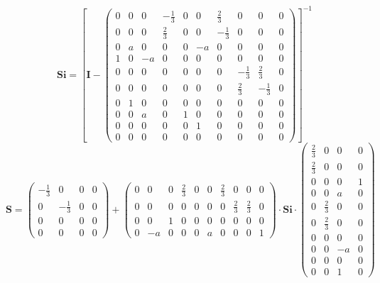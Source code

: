 \[ \mathbf{Si} =  \left[ \mathbf{I}  - \left(\begin{smallmatrix} 0 & 0 & 0 & -\frac{1}{3} & 0 & 0 & \frac{2}{3} & 0 & 0 & 0 \\ 0 & 0 & 0 & \frac{2}{3} & 0 & 0 & -\frac{1}{3} & 0 & 0 & 0 \\ 0 & a & 0 & 0 & 0 & -a & 0 & 0 & 0 & 0 \\ 1 & 0 & -a & 0 & 0 & 0 & 0 & 0 & 0 & 0 \\ 0 & 0 & 0 & 0 & 0 & 0 & 0 & -\frac{1}{3} & \frac{2}{3} & 0 \\ 0 & 0 & 0 & 0 & 0 & 0 & 0 & \frac{2}{3} & -\frac{1}{3} & 0 \\ 0 & 1 & 0 & 0 & 0 & 0 & 0 & 0 & 0 & 0 \\ 0 & 0 & a & 0 & 1 & 0 & 0 & 0 & 0 & 0 \\ 0 & 0 & 0 & 0 & 0 & 1 & 0 & 0 & 0 & 0 \\ 0 & 0 & 0 & 0 & 0 & 0 & 0 & 0 & 0 & 0 \end{smallmatrix}\right) \right]^{-1}  \]
\[ \mathbf{S} = \left(\begin{smallmatrix} -\frac{1}{3} & 0 & 0 & 0 \\ 0 & -\frac{1}{3} & 0 & 0 \\ 0 & 0 & 0 & 0 \\ 0 & 0 & 0 & 0 \end{smallmatrix}\right) + \left(\begin{smallmatrix} 0 & 0 & 0 & \frac{2}{3} & 0 & 0 & \frac{2}{3} & 0 & 0 & 0 \\ 0 & 0 & 0 & 0 & 0 & 0 & 0 & \frac{2}{3} & \frac{2}{3} & 0 \\ 0 & 0 & 1 & 0 & 0 & 0 & 0 & 0 & 0 & 0 \\ 0 & -a & 0 & 0 & 0 & a & 0 & 0 & 0 & 1 \end{smallmatrix}\right) \cdot \mathbf{Si} \cdot\left(\begin{smallmatrix} \frac{2}{3} & 0 & 0 & 0 \\ \frac{2}{3} & 0 & 0 & 0 \\ 0 & 0 & 0 & 1 \\ 0 & 0 & a & 0 \\ 0 & \frac{2}{3} & 0 & 0 \\ 0 & \frac{2}{3} & 0 & 0 \\ 0 & 0 & 0 & 0 \\ 0 & 0 & -a & 0 \\ 0 & 0 & 0 & 0 \\ 0 & 0 & 1 & 0 \end{smallmatrix}\right) \]
